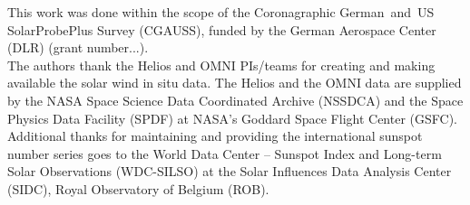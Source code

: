 \begin{acknowledgements}
	This work was done within the scope of the Coronagraphic German~and~US SolarProbePlus Survey (CGAUSS), funded by the German Aerospace Center (DLR) (grant number...).\\
	The authors thank the Helios and OMNI PIs/teams for creating and making available the solar wind in situ data. The Helios and the OMNI data are supplied by the NASA Space Science Data Coordinated Archive (NSSDCA) and the Space Physics Data Facility (SPDF) at NASA's Goddard Space Flight Center (GSFC).\\
	Additional thanks for maintaining and providing the international sunspot number series goes to the World Data Center -- Sunspot Index and Long-term Solar Observations (WDC-SILSO) at the Solar Influences Data Analysis Center (SIDC), Royal Observatory of Belgium (ROB).\\

\end{acknowledgements}
